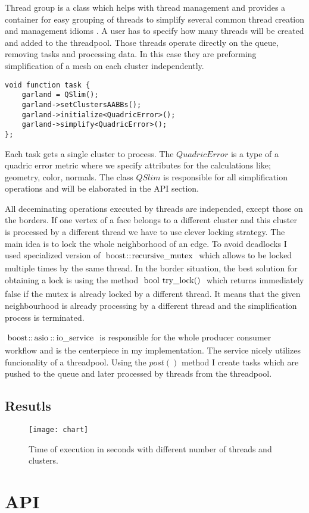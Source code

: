 Thread group is a class which helps with thread management and provides a container for easy grouping of threads to simplify several common thread creation and management idioms \cite{boost03}. A user has to specify how many threads will be created and added to the threadpool. Those threads operate directly on the queue, removing tasks and processing data. In this case they are preforming simplification of a mesh on each cluster independently.
\newline
\begin{center}
\begin{lstlisting}[caption={C style psuedocode of a task for a consumer},captionpos=b]
void function task {
    garland = QSlim();
    garland->setClustersAABBs();
    garland->initialize<QuadricError>();
    garland->simplify<QuadricError>();
};
\end{lstlisting}
\end{center}

Each task gets a single cluster to process. The $QuadricError$ is a type of a quadric error metric where we specify attributes for the calculations like; geometry, color, normals. The class $QSlim$ is responsible for all simplification operations and will be elaborated in the API section.

All deceminating operations executed by threads are independed, except those on the borders. If one vertex of a face belongs to a different cluster and this cluster is processed by a different thread we have to use clever locking strategy. The main idea is to lock the whole neighborhood of an edge. To avoid deadlocks I used specialized version of $\inlinecode{Java}{boost::recursive_mutex}$ which allows to be locked multiple times by the same thread. In the border situation, the best solution for obtaining a lock is using the method $\inlinecode{Java}{bool try_lock()}$ which returns immediately false if the mutex is already locked by a different thread. It means that the given neighbourhood is already processing by a different thread and the simplification process is terminated.

$\inlinecode{Java}{boost::asio::io_service}$ is responsible for the whole producer consumer workflow and is the centerpiece in my implementation. The service nicely utilizes funcionality of a threadpool. Using the $post()$ method I create tasks which are pushed to the queue and later processed by threads from the threadpool.

\newpage
\section{Resutls}

\begin{figure}[h!]
  \begin{center}
    \texttt{[image: chart]}
    \caption{Time of execution in seconds with different number of threads and clusters.}
    \label{fig:clustering}
  \end{center}
\end{figure}

\chapter{API}
